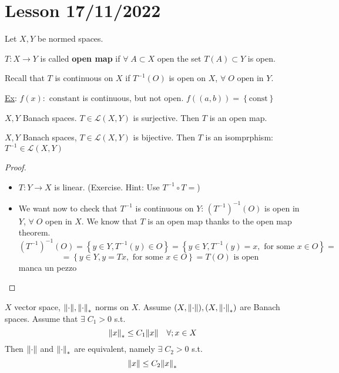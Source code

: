 \section{Lesson 17/11/2022}
Let \(X, Y\) be normed spaces.
\begin{definition}
    \(T: X \to Y\) is called \textbf{open map} if \(\forall \; A \subset X \mbox{ open }\)the set \(T(A)\subset Y\) is open.
\end{definition}
\begin{remark}
    Recall that \(T\) is continuous on \(X\) if \(T^{-1}(O)\) is open on \(X\), \(\forall \; O \mbox{ open in } Y\).
\end{remark}
\underline{Ex}: \(f(x) : \mbox{ constant}\) is continuous, but not open. \(f((a,b)) = \left\{ \mbox{const} \right\}\)
\begin{theorem}
    \(X, Y\) Banach spaces. \(T \in \mathcal{L}(X,Y)\) is surjective. Then \(T\) is an open map.
\end{theorem}
\begin{corollary}
    \(X,Y\) Banach spaces, \(T \in \mathcal{L}(X,Y)\) is bijective. Then \(T\) is an isomprphism: \(T^{-1} \in \mathcal{L}(X,Y)\)
\end{corollary}
\begin{proof}
    \begin{itemize}
        \item \(T : Y \to X\) is linear. (Exercise. Hint: Use \(T^{-1} \circ T = \))
        \item We want now to check that \(T^{-1}\) is continuous on \(Y\): \((T^{-1})^{-1}(O)\) is open in \(Y\), \(\forall \; O\) open in \(X\). We know that \(T\) is an open map thanks to the open map theorem.
        \[
            (T^{-1})^{-1}(O) = \left\{ y \in Y, T^{-1}(y) \in O \right\} = \left\{ y \in Y, T^{-1}(y) = x, \mbox{ for some } x \in O \right\} =
        \]
        \[
            = \left\{ y \in Y, y = Tx, \mbox{ for some } x \in O\right\} = T(O) \mbox{ is open}
        \]
        manca un pezzo
    \end{itemize}
\end{proof}
\begin{corollary}
    \(X\) vector space, \(\norm{\cdot}, \norm{\cdot}_*\) norms on \(X\). Assume \((X, \norm{\cdot}), (X, \norm{\cdot}_*)\) are Banach spaces. 
    Assume that \(\exists \; C_1 > 0\) s.t. 
    \[
        \norm{x}_* \leq C_1\norm{x} \quad \forall ; x \in X
    \]
    Then \(\norm{\cdot}\) and \(\norm{\cdot}_*\) are equivalent, namely \(\exists \; C_2 > 0\) s.t. 
    \[
        \norm{x} \leq C_2 \norm{x}_*
    \]
\end{corollary}
